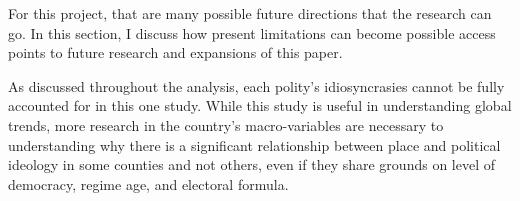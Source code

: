 \documentclass[12pt, titlepage]{article}
\begin{document}
For this project, that are many possible future directions that the research can go. In this section, I discuss how present limitations can become possible access points to future research and expansions of this paper.

As discussed throughout the analysis, each polity's idiosyncrasies cannot be fully accounted for in this one study. While this study is useful in understanding global trends, more research in the country's macro-variables are necessary to understanding why there is a significant relationship between place and political ideology in some counties and not others, even if they share grounds on level of democracy, regime age, and electoral formula.   

\clearpage


\let\svaddcontentsline\addcontentsline
\renewcommand\addcontentsline[3]{%
	\ifthenelse{\equal{#1}{lof}}{}%
	{\ifthenelse{\equal{#1}{lot}}{}{\svaddcontentsline{#1}{#2}{#3}}}}


\appendixtitleon
\appendixtitletocon
\end{document}
